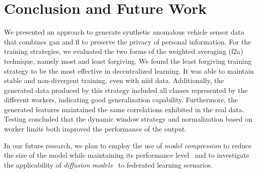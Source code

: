 \section{Conclusion and Future Work}


We presented an approach to generate synthetic anomalous vehicle sensor data that combines \gls*{gan} and \gls*{fl} to preserve the privacy of personal information. For the training strategies, %
%
we evaluated the two forms of the weighted averaging (\gls*{f2a}) technique, namely most and least forgiving. %
%
We found the least forgiving training strategy to be the most effective in decentralized learning. It was able to maintain stable and non-divergent training, even with \gls*{niid} data. Additionally, the generated data produced by this strategy included all classes represented by the different workers, indicating good generalization capability. Furthermore, the generated features maintained the same correlations exhibited in the real data.
%
Testing concluded that the dynamic window strategy and normalization based on worker limits both improved the performance of the output. 


In our future research, we plan to employ the use of \textit{model compression} to reduce the size of the model while maintaining its performance level~\cite{hinton2015distilling} and to investigate the applicability of \textit{diffusion models}~\cite{alcaraz_diffusion-based_2022} to federated learning scenarios.
 
